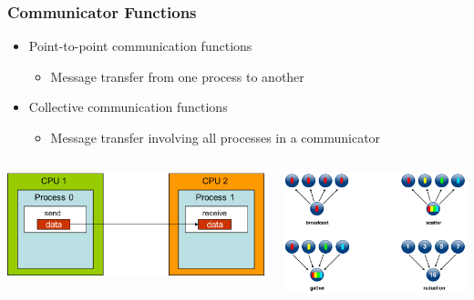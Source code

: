 \documentclass[9pt,c]{beamer}
\begin{document}
\begin{frame}
  \frametitle{Communicator Functions}
  \begin{itemize}
  \item Point-to-point communication functions
    \begin{itemize}
    \item Message transfer from one process to another
    \end{itemize}
  \item Collective communication functions 
    \begin{itemize}
    \item Message transfer involving all processes in a communicator
    \end{itemize}
  \end{itemize}
  \begin{columns}
    \begin{center}
      \includegraphics[width=\textwidth]{./SimpleSendAndRecv}
    \end{center}
    \begin{center}
      \includegraphics[width=\textwidth]{./collective_comm}
    \end{center}
  \end{columns}
\end{frame}
\end{document}

